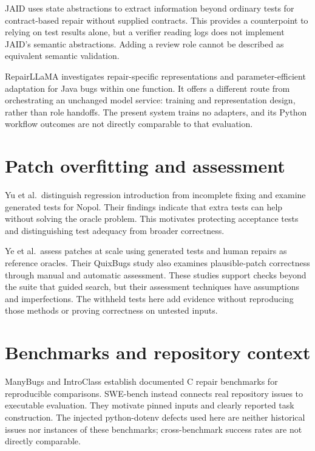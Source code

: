 JAID uses state abstractions to extract information beyond ordinary tests for contract-based repair without supplied contracts. This provides a counterpoint to relying on test results alone, but a verifier reading logs does not implement JAID's semantic abstractions. Adding a review role cannot be described as equivalent semantic validation. \citep{chen2021contractrepair}

RepairLLaMA investigates repair-specific representations and parameter-efficient adaptation for Java bugs within one function. It offers a different route from orchestrating an unchanged model service: training and representation design, rather than role handoffs. The present system trains no adapters, and its Python workflow outcomes are not directly comparable to that evaluation. \citep{silva2025repairllama}

\section{Patch overfitting and assessment}\label{sec:2.3}

Yu et al.~distinguish regression introduction from incomplete fixing and examine generated tests for Nopol. Their findings indicate that extra tests can help without solving the oracle problem. This motivates protecting acceptance tests and distinguishing test adequacy from broader correctness. \citep{yu2019overfitting}

Ye et al.~assess patches at scale using generated tests and human repairs as reference oracles. Their QuixBugs study also examines plausible-patch correctness through manual and automatic assessment. These studies support checks beyond the suite that guided search, but their assessment techniques have assumptions and imperfections. The withheld tests here add evidence without reproducing those methods or proving correctness on untested inputs. \citep{ye2021assessment, ye2021quixbugs}

\section{Benchmarks and repository context}\label{sec:2.4}

ManyBugs and IntroClass establish documented C repair benchmarks for reproducible comparisons. SWE-bench instead connects real repository issues to executable evaluation. They motivate pinned inputs and clearly reported task construction. The injected python-dotenv defects used here are neither historical issues nor instances of these benchmarks; cross-benchmark success rates are not directly comparable. \citep{legoues2015manybugs, jimenez2024swebench}

